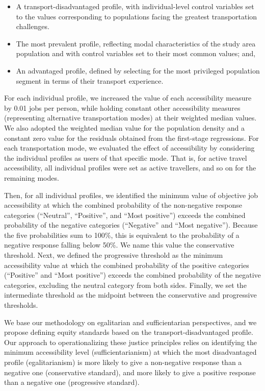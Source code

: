 \documentclass[preprint, 3p,
authoryear]{elsarticle} %
\begin{document}
\begin{itemize}
\item
  A transport-disadvantaged profile, with individual-level control
  variables set to the values corresponding to populations facing the
  greatest transportation challenges.
\item
  The most prevalent profile, reflecting modal characteristics of the
  study area population and with control variables set to their most
  common values; and,
\item
  An advantaged profile, defined by selecting for the most privileged
  population segment in terms of their transport experience.
\end{itemize}

For each individual profile, we increased the value of each
accessibility measure by 0.01 jobs per person, while holding constant
other accessibility measures (representing alternative transportation
modes) at their weighted median values. We also adopted the weighted
median value for the population density and a constant zero value for
the residuals obtained from the first-stage regressions. For each
transportation mode, we evaluated the effect of accessibility by
considering the individual profiles as users of that specific mode. That
is, for active travel accessibility, all individual profiles were set as
active travellers, and so on for the remaining modes.

Then, for all individual profiles, we identified the minimum value of
objective job accessibility at which the combined probability of the
non-negative response categories (``Neutral'', ``Positive'', and ``Most
positive'') exceeds the combined probability of the negative categories
(``Negative'' and ``Most negative''). Because the five probabilities sum
to 100\%, this is equivalent to the probability of a negative response
falling below 50\%. We name this value the conservative threshold. Next,
we defined the progressive threshold as the minimum accessibility value
at which the combined probability of the positive categories
(``Positive'' and ``Most positive'') exceeds the combined probability of
the negative categories, excluding the neutral category from both sides.
Finally, we set the intermediate threshold as the midpoint between the
conservative and progressive thresholds.

We base our methodology on egalitarian and sufficientarian perspectives,
and we propose defining equity standards based on the
transport-disadvantaged profile. Our approach to operationalizing these
justice principles relies on identifying the minimum accessibility level
(sufficientarianism) at which the most disadvantaged profile
(egalitarianism) is more likely to give a non-negative response than a
negative one (conservative standard), and more likely to give a positive
response than a negative one (progressive standard).
\end{document}
